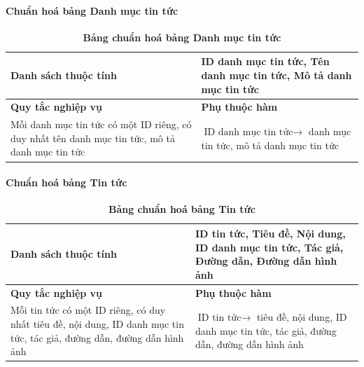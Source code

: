 \paragraph{Chuẩn hoá bảng Danh mục tin tức}
\mbox{}


\begin{table}[H]
  \caption{\bfseries \fontsize{12pt}{0pt}\selectfont Bảng chuẩn hoá bảng Danh mục tin tức}
  \centering
  \begin{tabularx}{0.9\textwidth}{|X|X|}
    \hline
    \textbf{Danh sách thuộc tính} & ID danh mục tin tức, Tên danh mục tin tức, Mô tả danh mục tin
    tức \\ %
    \hline
    \textbf{Quy tắc nghiệp vụ} & \textbf{Phụ thuộc hàm} \\
    \hline
    Mỗi danh mục tin tức có một ID riêng, có duy nhất tên danh mục tin tức, mô tả danh mục tin
    tức & \parbox[t]{\linewidth}{$\text{ID danh mục tin tức} \rightarrow$ danh mục tin tức, mô tả danh mục tin
    tức} \\
    \hline
     \\
     \\
    \hline
  \end{tabularx}
\end{table}


\paragraph{Chuẩn hoá bảng Tin tức}
\mbox{}

\begin{table}[H]
  \caption{\bfseries \fontsize{12pt}{0pt}\selectfont Bảng chuẩn hoá bảng Tin tức}
  \centering
  \begin{tabularx}{0.9\textwidth}{|X|X|}
    \hline
    \textbf{Danh sách thuộc tính} & ID tin tức, Tiêu đề, Nội dung, ID danh mục tin tức, Tác giả, Đường dẫn,
    Đường dẫn hình ảnh \\ %
    \hline
    \textbf{Quy tắc nghiệp vụ} & \textbf{Phụ thuộc hàm} \\
    \hline
    Mỗi tin tức có một ID riêng, có duy nhất tiêu đề, nội dung, ID danh mục tin tức, tác giả, đường dẫn,
    đường dẫn hình ảnh & \parbox[t]{\linewidth}{$\text{ID tin tức} \rightarrow$ tiêu đề, nội dung, ID danh mục tin tức, tác giả, đường dẫn,
    đường dẫn hình ảnh} \\
    \hline
     \\
     \\
    \hline
  \end{tabularx}
\end{table}



